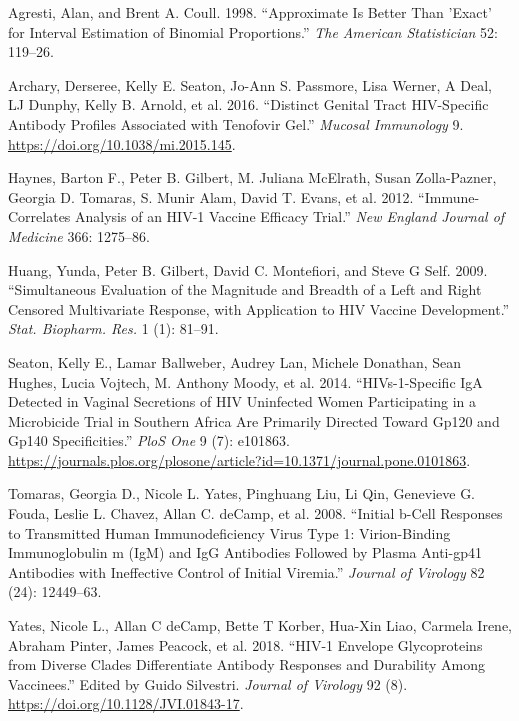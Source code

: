 \documentclass[12pt]{article}
\newenvironment{CSLReferences}%
  {}%
  {\par}
\begin{document}
\hypertarget{refs}{}
\begin{CSLReferences}{1}{0}
\leavevmode{}%
Agresti, Alan, and Brent A. Coull. 1998. {``Approximate Is Better Than
'Exact' for Interval Estimation of Binomial Proportions.''} \emph{The
American Statistician} 52: 119--26.

\leavevmode{}%
Archary, Derseree, Kelly E. Seaton, Jo-Ann S. Passmore, Lisa Werner, A
Deal, LJ Dunphy, Kelly B. Arnold, et al. 2016. {``Distinct Genital Tract
{HIV}-Specific Antibody Profiles Associated with Tenofovir Gel.''}
\emph{Mucosal Immunology} 9. \url{https://doi.org/10.1038/mi.2015.145}.

\leavevmode{}%
Haynes, Barton F., Peter B. Gilbert, M. Juliana McElrath, Susan
Zolla-Pazner, Georgia D. Tomaras, S. Munir Alam, David T. Evans, et al.
2012. {``Immune-Correlates Analysis of an {HIV-1} Vaccine Efficacy
Trial.''} \emph{New England Journal of Medicine} 366: 1275--86.

\leavevmode{}%
Huang, Yunda, Peter B. Gilbert, David C. Montefiori, and Steve G Self.
2009. {``Simultaneous Evaluation of the Magnitude and Breadth of a Left
and Right Censored Multivariate Response, with Application to {HIV}
Vaccine Development.''} \emph{Stat. Biopharm. Res.} 1 (1): 81--91.

\leavevmode{}%
Seaton, Kelly E., Lamar Ballweber, Audrey Lan, Michele Donathan, Sean
Hughes, Lucia Vojtech, M. Anthony Moody, et al. 2014.
{``{HIV}s-1-Specific {IgA} Detected in Vaginal Secretions of {HIV}
Uninfected Women Participating in a Microbicide Trial in Southern Africa
Are Primarily Directed Toward Gp120 and Gp140 Specificities.''}
\emph{PloS One} 9 (7): e101863.
\url{https://journals.plos.org/plosone/article?id=10.1371/journal.pone.0101863}.

\leavevmode{}%
Tomaras, Georgia D., Nicole L. Yates, Pinghuang Liu, Li Qin, Genevieve
G. Fouda, Leslie L. Chavez, Allan C. deCamp, et al. 2008. {``Initial
b-Cell Responses to Transmitted Human Immunodeficiency Virus Type 1:
Virion-Binding Immunoglobulin m (IgM) and IgG Antibodies Followed by
Plasma Anti-{gp41} Antibodies with Ineffective Control of Initial
Viremia.''} \emph{Journal of Virology} 82 (24): 12449--63.

\leavevmode{}%
Yates, Nicole L., Allan C deCamp, Bette T Korber, Hua-Xin Liao, Carmela
Irene, Abraham Pinter, James Peacock, et al. 2018. {``{HIV}-1 Envelope
Glycoproteins from Diverse Clades Differentiate Antibody Responses and
Durability Among Vaccinees.''} Edited by Guido Silvestri. \emph{Journal
of Virology} 92 (8). \url{https://doi.org/10.1128/JVI.01843-17}.


\end{CSLReferences}
\end{document}
